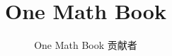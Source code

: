 \documentclass[11pt,a4paper,twoside,openany]{book}
\title{One Math Book}
\author{One Math Book 贡献者}
\date{\bookdate}
\begin{document}
\frontmatter



\tableofcontents

\mainmatter



\appendix
\part{\omsolutionspart}


\backmatter
\printindex
\end{document}

